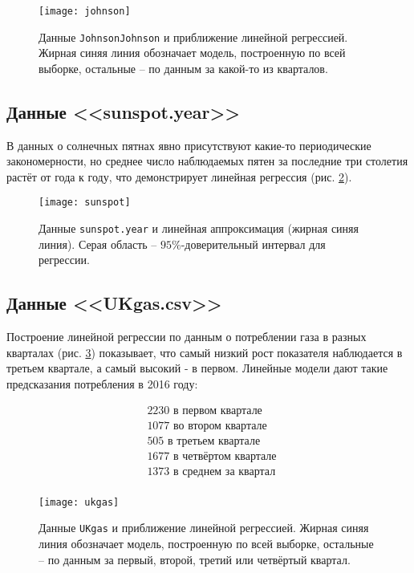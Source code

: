 \documentclass[a4paper,12pt]{article} %
\begin{document}
\begin{figure}[H]
    \centering \texttt{[image: johnson]}
    \caption{Данные \texttt{JohnsonJohnson} и приближение линейной регрессией. Жирная синяя линия обозначает модель, построенную по всей выборке, остальные -- по данным за какой-то из кварталов. }
    \label{fig:johnson}
\end{figure}

\newpage
\subsection{Данные <<sunspot.year>>}

В данных о солнечных пятнах явно присутствуют какие-то периодические закономерности, но среднее число наблюдаемых пятен за последние три столетия растёт от года к году, что демонстрирует линейная регрессия (рис. \ref{fig:sunspot}).

\begin{figure}[H]
    \centering \texttt{[image: sunspot]}
    \caption{Данные \texttt{sunspot.year} и линейная аппроксимация (жирная синяя линия). Серая область -- $95\%$-доверительный интервал для регрессии.}
    \label{fig:sunspot}
\end{figure}

\newpage
\subsection{Данные <<UKgas.csv>>}

Построение линейной регрессии по данным о потреблении газа в разных кварталах (рис. \ref{fig:ukgas}) показывает, что самый низкий рост показателя наблюдается в третьем квартале, а самый высокий - в первом. Линейные модели дают такие предсказания потребления в 2016 году:

\begin{align*}
    & 2230 \text{ в первом квартале} \\
    & 1077 \text{ во втором квартале} \\
    & 505 \text{ в третьем квартале} \\
    & 1677 \text{ в четвёртом квартале} \\
    & 1373 \text{ в среднем за квартал } \\
\end{align*}


\begin{figure}[H]
    \centering \texttt{[image: ukgas]}
    \caption{Данные \texttt{UKgas} и приближение линейной регрессией. Жирная синяя линия обозначает модель, построенную по всей выборке, остальные -- по данным за первый, второй, третий или четвёртый квартал. }
    \label{fig:ukgas}
\end{figure}
\end{document}
